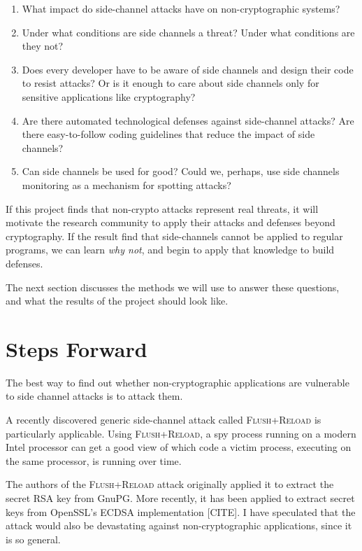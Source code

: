 \documentclass{acm_proc_article-sp}
\begin{document}
\begin{enumerate}
\item What impact do side-channel attacks have on non-cryptographic systems?

\item Under what conditions are side channels a threat? Under what conditions
      are they not?

\item Does every developer have to be aware of side channels and design their
      code to resist attacks? Or is it enough to care about side channels only
      for sensitive applications like cryptography?

\item Are there automated technological defenses against side-channel attacks?
      Are there easy-to-follow coding guidelines that reduce the impact of side
      channels?

\item Can side channels be used for good? Could we, perhaps, use side channels
      monitoring as a mechanism for spotting attacks?
\end{enumerate}

If this project finds that non-crypto attacks represent real threats, it will
motivate the research community to apply their attacks and defenses beyond
cryptography. If the result find that side-channels cannot be applied to regular
programs, we can learn \emph{why not}, and begin to apply that knowledge to
build defenses.

The next section discusses the methods we will use to answer these questions,
and what the results of the project should look like.

\section{Steps Forward}
\label{sec:stepsforward}

The best way to find out whether non-cryptographic applications are vulnerable
to side channel attacks is to attack them.

A recently discovered generic side-channel attack called \textsc{Flush+Reload}
\cite{yarom2013flush} is particularly applicable. Using \textsc{Flush+Reload},
a spy process running on a modern Intel processor can get a good view of which
code a victim process, executing on the same processor, is running over time.

The authors of the \textsc{Flush+Reload} attack originally applied it to extract
the secret RSA key from GnuPG. More recently, it has been applied to extract
secret keys from OpenSSL's ECDSA implementation [CITE]. I have speculated
\cite{hornby2013flush} that the attack would also be devastating against
non-cryptographic applications, since it is so general.
\end{document}
